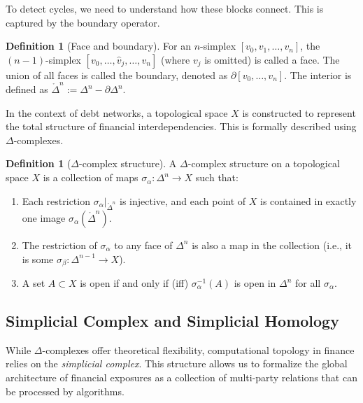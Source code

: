\documentclass[12pt,reqno]{amsart}
\theoremstyle{definition}
\newtheorem{definition}[theorem]{Definition}
\numberwithin{equation}{section}
\begin{document}
    To detect cycles, we need to understand how these blocks connect. This is captured by the boundary operator.

    \begin{definition}[Face and boundary]
        For an $n$-simplex $[v_0, v_1, \dots, v_n]$, the $(n-1)$-simplex $[v_0, \dots, \hat{v}_j, \dots, v_n]$ (where $v_j$ is omitted) is called a face. The union of all faces is called the boundary, denoted as $\partial [v_0, \dots, v_n]$. The interior is defined as $\mathring{\Delta}^n := \Delta^n - \partial \Delta^n$.
    \end{definition}

    In the context of debt networks, a topological space $X$ is constructed to represent the total structure of financial interdependencies. This is formally described using $\Delta$-complexes.

    \begin{definition}[$\Delta$-complex structure]
    A $\Delta$-complex structure on a topological space $X$ is a collection of maps $\sigma_\alpha: \Delta^n \to X$ such that:
    \begin{enumerate}
        \item Each restriction $\sigma_\alpha|_{\mathring{\Delta}^n}$ is injective, and each point of $X$ is contained in exactly one image $\sigma_\alpha(\mathring{\Delta}^n)$.
        \item The restriction of $\sigma_\alpha$ to any face of $\Delta^n$ is also a map in the collection (i.e., it is some $\sigma_\beta:\Delta^{n-1}\to X$).
        \item A set $A\subset X$ is open if and only if (iff) $\sigma_\alpha^{-1}(A)$ is open in $\Delta^n$ for all $\sigma_\alpha$.
    \end{enumerate}
    \end{definition}

    
    \subsection{Simplicial Complex and Simplicial Homology}

    While $\Delta$-complexes offer theoretical flexibility, computational topology in finance relies on the \textit{simplicial complex}. This structure allows us to formalize the global architecture of financial exposures as a collection of multi-party relations that can be processed by algorithms.
    
\end{document}
